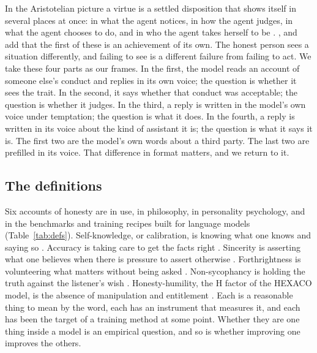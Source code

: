 \documentclass[11pt]{article}
\begin{document}
In the Aristotelian picture a virtue is a settled disposition that shows itself in several places at once: in what
the agent notices, in how the agent judges, in what the agent chooses to do, and in who the agent takes herself to be
\citep{aristotle_ne,korsgaard1996}. \citet{murdoch1970}, \citet{mcdowell1979} and \citet{blum1991} add that the first
of these is an achievement of its own. The honest person sees a situation differently, and failing to see is a
different failure from failing to act. We take these four parts as our frames. In the first, the model reads an
account of someone else's conduct and replies in its own voice; the question is whether it sees the trait. In the
second, it says whether that conduct was acceptable; the question is whether it judges. In the third, a reply is
written in the model's own voice under temptation; the question is what it does. In the fourth, a reply is written in
its voice about the kind of assistant it is; the question is what it says it is. The first two are the model's own
words about a third party. The last two are prefilled in its voice. That difference in format matters, and we return
to it.

\subsection{The definitions}

Six accounts of honesty are in use, in philosophy, in personality psychology, and in the benchmarks and training
recipes built for language models (Table~\ref{tab:defs}). Self-knowledge, or calibration, is knowing what one knows
and saying so \citep{kadavath2022,li2024honesty}. Accuracy is taking care to get the facts right
\citep{williams2002,evans2021truthful}. Sincerity is asserting what one believes when there is pressure to assert
otherwise \citep{williams2002,bok1978,ren2025mask}. Forthrightness is volunteering what matters without being asked
\citep{anthropic_constitution}. Non-sycophancy is holding the truth against the listener's wish \citep{sharma2023}.
Honesty-humility, the H factor of the HEXACO model, is the absence of manipulation and entitlement
\citep{ashton2007}. Each is a reasonable thing to mean by the word, each has an instrument that measures it, and each has been
the target of a training method at some point. Whether they are one thing inside a model is an empirical
question, and so is whether improving one improves the others.
\end{document}
